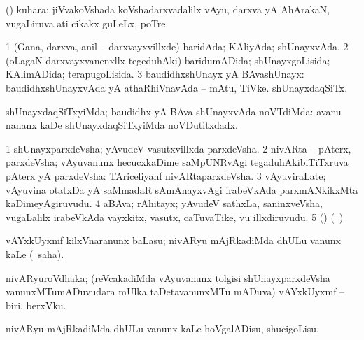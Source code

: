 \bentry
{} 
\gl{\nA}
\expl{}
\bmng
 (\jiVvi) kuhara; jiVvakoVshada koVshadarxvadalilx vAyu, darxva yA AhArakaN, \mo vugaLiruva ati cikakx guLeLx, poTre. 
\emng
\eentry

\bentry
{} 
\gl{\gu}
\expl{}
\bmng
\bnum
\num{1} (Gana, darxva, anil -- darxvayxvillxde) baridAda; KAliyAda; shUnayxvAda. 
\num{2} (oLagaN darxvayxvanenxllx tegeduhAki) baridumADida; shUnayxgoLisida; KAlimADida; terapugoLisida. 
\num{3} baudidhxshUnayx yA BAvashUnayx:  baudidhxshUnayxvAda yA athaRhiVnavAda -- mAtu, TiVke.  shUnayxdaqSiTx. 
\enum
\emng
\eentry

\bentry
{} 
\gl{\kirxvi}
\expl{}
\bmng
 shUnayxdaqSiTxyiMda; baudidhx yA BAva shUnayxvAda noVTdiMda:  avanu nananx kaDe shUnayxdaqSiTxyiMda noVDutitxdadx. 
\emng
\eentry

\bentry
{} 
\gl{\nA}
\expl{}
\bmng
\emng
\eentry

\bentry
{} 
\gl{\nA}
\bmng
\bnum
\num{1} shUnayxparxdeVsha; yAvudeV vasutxvillxda parxdeVsha. 
\num{2} nivARta -- pAterx, parxdeVsha; vAyuvanunx hecucxkaDime saMpUNRvAgi tegaduhAkibiTiTxruva pAterx yA parxdeVsha:  TAriceliyanf nivARtaparxdeVsha. 
\num{3} vAyuviraLate; vAyuvina otatxDa yA saMmadaR sAmAnayxvAgi irabeVkAda parxmANkikxMta kaDimeyAgiruvudu. 
\num{4} aBAva; rAhitayx; yAvudeV sathxLa, saninxveVsha, \mo vugaLalilx irabeVkAda vayxkitx, vasutx, caTuvaTike, \mo vu illxdiruvudu. 
\num{5} (\AmA) (\bava\ )  
\enum
\emng
\eentry

\bentry
{} 
\gl{\sakirx}
\expl{}
\bmng
 vAYxkUyxmf kilxVnaranunx baLasu; nivARyu mAjRkadiMda dhULu \mo vanunx kaLe (\akirx\ saha). 
\emng
\eentry

\bentry
{}
\gl{\nA}
\expl{}
\bmng
 nivARyuroVdhaka; (reVcakadiMda vAyuvanunx tolgisi shUnayxparxdeVsha vanunxMTumADuvudara mUlka taDetavanunxMTu mADuva) vAYxkUyxmf -- biri, berxVku. 
\emng
\eentry

\bentry
{} 
\gl{\sakirx}
\expl{}
\bmng
 nivARyu mAjRkadiMda dhULu \mo vanunx kaLe hoVgalADisu, shucigoLisu. 
\emng
\eentry

